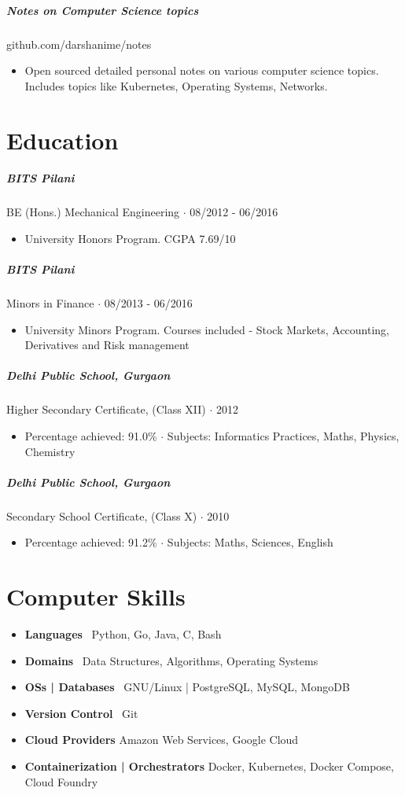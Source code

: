 \documentclass[10pt,letterpaper]{article}
\begin{document}
\subparagraph{Notes on Computer Science topics}
github.com/darshanime/notes
\begin{itemize}
    \item Open sourced detailed personal notes on various computer science topics. Includes topics like Kubernetes, Operating Systems, Networks.
\end{itemize}

\section*{Education}

\subparagraph{BITS Pilani}
 BE (Hons.) Mechanical Engineering $\cdot$ 08/2012 - 06/2016
\begin{itemize}
    \item University Honors Program.  CGPA 7.69/10
\end{itemize}

\subparagraph{BITS Pilani}
Minors in Finance $\cdot$ 08/2013 - 06/2016
\begin{itemize}
    \item University Minors Program. Courses included - Stock Markets, Accounting, Derivatives and Risk management
\end{itemize}

\subparagraph{Delhi Public School, Gurgaon}
Higher Secondary Certificate, (Class XII) $\cdot$ 2012
\begin{itemize}
    \item Percentage achieved: 91.0\% $\cdot$ Subjects: Informatics Practices, Maths, Physics, Chemistry
\end{itemize}

\subparagraph{Delhi Public School, Gurgaon}
Secondary School Certificate, (Class X) $\cdot$ 2010
\begin{itemize}
    \item Percentage achieved: 91.2\% $\cdot$ Subjects: Maths, Sciences, English
\end{itemize}

\section*{Computer Skills}

\begin{itemize}
    \item \textbf{Languages} \ Python, Go, Java, C, Bash
    \item \textbf{Domains} \ Data Structures, Algorithms, Operating Systems
    \item \textbf{OSs | Databases} \ GNU/Linux | PostgreSQL, MySQL, MongoDB
    \item \textbf{Version Control} \ Git
    \item \textbf{Cloud Providers} Amazon Web Services, Google Cloud
    \item \textbf{Containerization | Orchestrators} Docker, Kubernetes, Docker Compose, Cloud Foundry
\end{itemize}
\end{document}
